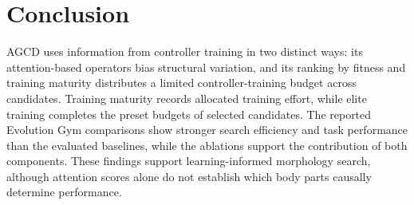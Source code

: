 \documentclass{article}
\begin{document}
    \section{Conclusion}
    AGCD uses information from controller training in two distinct ways: its
    attention-based operators bias structural variation, and its ranking by
    fitness and training maturity distributes a limited controller-training
    budget across candidates. Training maturity records allocated training
    effort, while elite training completes the preset budgets of selected
    candidates. The
    reported Evolution Gym comparisons show stronger search efficiency and
    task performance than the evaluated baselines, while the ablations support
    the contribution of both components. These findings support
    learning-informed morphology search, although attention scores alone do not
    establish which body parts causally determine performance.

    \appendix
    
    

    \onecolumn
    \renewcommand{\thesubsection}{\Alph{subsection}}
\end{document}
